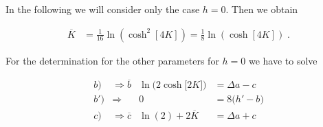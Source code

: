 %
In the following we will consider only the case $h=0$. Then we obtain  

%
\begin{align}\label{eq:ol:K}
\overline K &= \frac{1}{16}\ln(\cosh^{2}[4 K])
= \frac{1}{8}\ln(\cosh[4 K])\;.
\end{align}
%

For the determination for the other parameters for $h=0$ we have to solve

%
\begin{align*}
b)&\Rightarrow \overline{b}& \ln\bigg(2\cosh\big[2 K\big] \bigg) &=
\Delta a -c \tag{$\overline b$}\\
b')&\Rightarrow&0&= 8\big(h' -b \big)\tag{$\overline b'$}\\
c)&\Rightarrow\overline{c}& \ln(2) + 2 \overline K &=\Delta a +c   \tag{$\overline c$}
\end{align*}
%


